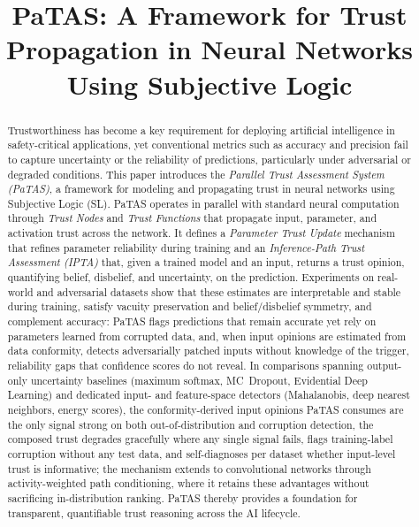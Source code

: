 \documentclass[conference]{IEEEtran}
\begin{document}
\title{PaTAS: A Framework for Trust Propagation in Neural Networks Using Subjective Logic}


\maketitle

\begin{abstract}
Trustworthiness has become a key requirement for deploying artificial intelligence in safety-critical applications, yet conventional metrics such as accuracy and precision fail to capture uncertainty or the reliability of predictions, particularly under adversarial or degraded conditions. This paper introduces the \emph{Parallel Trust Assessment System (PaTAS)}, a framework for modeling and propagating trust in neural networks using Subjective Logic (SL). PaTAS operates in parallel with standard neural computation through \emph{Trust Nodes} and \emph{Trust Functions} that propagate input, parameter, and activation trust across the network. It defines a \emph{Parameter Trust Update} mechanism that refines parameter reliability during training and an \emph{Inference-Path Trust Assessment (IPTA)} that, given a trained model and an input, returns a trust opinion, quantifying belief, disbelief, and uncertainty, on the prediction. Experiments on real-world and adversarial datasets show that these estimates are interpretable and stable during training, satisfy vacuity preservation and belief/disbelief symmetry, and complement accuracy: PaTAS flags predictions that remain accurate yet rely on parameters learned from corrupted data, and, when input opinions are estimated from data conformity, detects adversarially patched inputs without knowledge of the trigger, reliability gaps that confidence scores do not reveal. In comparisons spanning output-only uncertainty baselines (maximum softmax, MC~Dropout, Evidential Deep Learning) and dedicated input- and feature-space detectors (Mahalanobis, deep nearest neighbors, energy scores), the conformity-derived input opinions PaTAS consumes are the only signal strong on both out-of-distribution and corruption detection, the composed trust degrades gracefully where any single signal fails, flags training-label corruption without any test data, and self-diagnoses per dataset whether input-level trust is informative; the mechanism extends to convolutional networks through activity-weighted path conditioning, where it retains these advantages without sacrificing in-distribution ranking. PaTAS thereby provides a foundation for transparent, quantifiable trust reasoning across the AI lifecycle.
\end{abstract}
\end{document}
